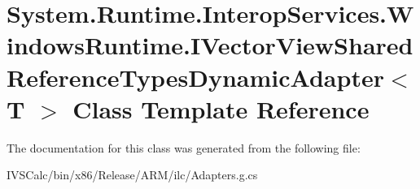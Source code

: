\hypertarget{class_system_1_1_runtime_1_1_interop_services_1_1_windows_runtime_1_1_i_vector_view_shared_reference_types_dynamic_adapter}{}\section{System.\+Runtime.\+Interop\+Services.\+Windows\+Runtime.\+I\+Vector\+View\+Shared\+Reference\+Types\+Dynamic\+Adapter$<$ T $>$ Class Template Reference}
\label{class_system_1_1_runtime_1_1_interop_services_1_1_windows_runtime_1_1_i_vector_view_shared_reference_types_dynamic_adapter}


The documentation for this class was generated from the following file\+:\begin{DoxyCompactItemize}
\item 
I\+V\+S\+Calc/bin/x86/\+Release/\+A\+R\+M/ilc/Adapters.\+g.\+cs\end{DoxyCompactItemize}
